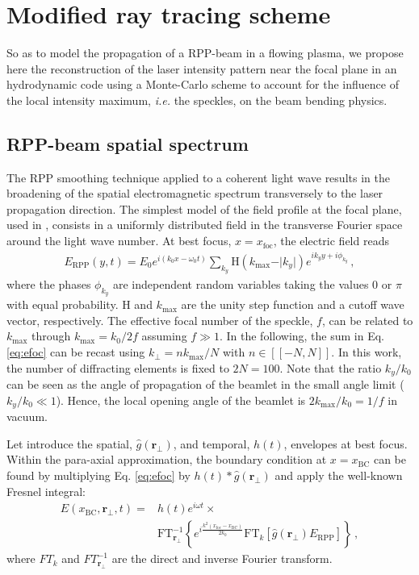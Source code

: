 \documentclass[%
 reprint,
 amsmath,amssymb,
 aps,
]{revtex4-1}
\begin{document}
\section{Modified ray tracing scheme}
So as to model the propagation of a RPP-beam in a flowing plasma, we propose here the reconstruction of the laser intensity pattern near the focal plane in an hydrodynamic code using a Monte-Carlo scheme to account for the influence of the local intensity maximum, \emph{i.e.} the speckles, on the beam bending physics.

\subsection{RPP-beam spatial spectrum}
The RPP smoothing technique applied to a coherent light wave results in the broadening of the spatial electromagnetic spectrum transversely to the laser propagation direction. 
The simplest model of the field profile at the focal plane, used in \cite[]{POF_Schmitt_88,POF_Rose_93}, consists in a uniformly distributed field in the transverse Fourier space around the light wave number. At best focus, $x=x_\mathrm{foc}$, the electric field reads
\begin{align}
    E_\mathrm{RPP}(y,t) =E_0 e^{i (k_0 x -\omega_0 t ) }   \sum_{k_y} \mathrm{H}( k_\mathrm{max} - \vert k_y \vert )e^{i k_y y +i\phi_{k_y}  }  \, , \label{eq:efoc}
\end{align}
where the phases $\phi_{k_y}$  are independent random variables taking the values $0$ or $\pi$ with equal probability. $\mathrm{H}$ and  $k_\mathrm{max}$ are the unity step function and a cutoff wave vector, respectively. The effective focal number of the speckle, $f$, can be related to  $k_\mathrm{max}$ through  $k_\mathrm{max}=k_0/2f$ assuming $f\gg 1$.
In the following, the sum in Eq. \eqref{eq:efoc} can be recast using $k_\perp =  n k_\mathrm{max}/N$ with $n\in[\![-N,N]\!]$. In this work, the number of diffracting elements is fixed to $2N=100$.
Note that the ratio $k_y/k_0$ can be seen as the angle of propagation of the beamlet in the small angle limit ($k_y/k_0\ll1$). Hence,   the local opening angle of the beamlet is $2k_\mathrm{max}/k_0 = 1/f$ in vacuum.
%

Let introduce the spatial, $\hat{g}(\mathbf{r}_\perp)$, and temporal, $h(t)$, envelopes at best focus. Within the para-axial approximation, the boundary condition at $x=x_\mathrm{BC}$ can be found by multiplying Eq. \eqref{eq:efoc} by $h(t)*\hat{g}(\mathbf{r}_\perp)$  and  apply the well-known Fresnel integral:
\begin{align}
    E(x_\mathrm{BC},\mathbf{r}_\perp,t) =&h(t)e^{i\omega t}\times  \nonumber \\
    &\mathrm{FT}^{-1}_{\mathbf{r}_\perp} \left\{ e^{i \frac{k^2 (x_\mathrm{foc}-x_\mathrm{BC}) }{2k_0}} 
   \mathrm{FT}_k \left[ \hat{g}(\mathbf{r}_\perp)E_\mathrm{RPP} \right]  \right\}  \, , \label{eq:ebc}
\end{align}
where $FT_k$ and $FT^{-1}_{\mathbf{r}_\perp}$ are the direct and inverse Fourier transform. 
\end{document}
